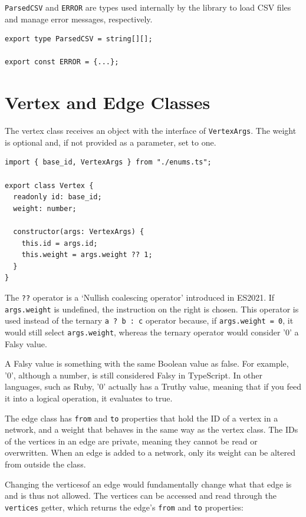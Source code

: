 \texttt{ParsedCSV} and \texttt{ERROR} are types used internally
by the library to load CSV files and manage error messages, respectively.

\begin{verbatim}
export type ParsedCSV = string[][];

export const ERROR = {...};
\end{verbatim}

\section{Vertex and Edge Classes}
The vertex class receives an object with the interface of \texttt{VertexArgs}.
The weight is optional and, if not provided as a parameter, set to one.

\begin{verbatim}
import { base_id, VertexArgs } from "./enums.ts";

export class Vertex {
  readonly id: base_id;
  weight: number;

  constructor(args: VertexArgs) {
    this.id = args.id;
    this.weight = args.weight ?? 1;
  }
}
\end{verbatim}

The \texttt{??} operator is a `Nullish coalescing operator' introduced in ES2021.
If \texttt{args.weight} is undefined, the instruction on the right is chosen.
This operator is used instead of the ternary \texttt{a ? b : c} operator
because, if \texttt{args.weight = 0}, it would still select \texttt{args.weight},
whereas the ternary operator would consider '0' a Falsy value.

A Falsy value is something with the same Boolean value as false.
For example, '0', although a number, is still considered Falsy in TypeScript.
In other languages, such as Ruby, '0' actually has a Truthy value,
meaning that if you feed it into a logical operation, it evaluates to true.

The edge class has \texttt{from} and \texttt{to} properties that hold
the ID of a vertex in a network, and a weight that behaves in the same way as the vertex class.
The IDs of the vertices in an edge are private, meaning they cannot be read or overwritten.
When an edge is added to a network, only its weight can be altered from outside the class.

Changing the verticesof an edge would fundamentally change what that edge is and is thus not allowed.
The vertices can be accessed and read through the \texttt{vertices} getter,
which returns the edge's \texttt{from} and \texttt{to} properties:

